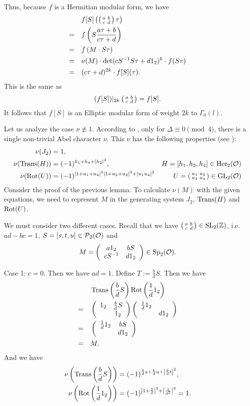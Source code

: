 \begin{lemma}[Restriction]
Thus, because $f$ is a Hermitian modular form, we have
\begin{align*}
& f[S] \left(\left( \begin{smallmatrix} a & b \\ c & d \end{smallmatrix} \right) \tau\right) \\
=\quad & f\left(S \frac{a \tau + b}{c \tau + d} \right) \\
=\quad & f\left( M \cdot S \tau \right) \\
=\quad & \nu(M) \cdot \det(c S^{-1} S \tau + d 1_2)^k \cdot f(S \tau) \\
=\quad & (c \tau + d)^{2k} \cdot f[S](\tau) .
\end{align*}
This is the same as
\[ (f[S]) |_{2k} \left( \begin{smallmatrix} a & b \\ c & d \end{smallmatrix} \right) = f[S] . \]
It follows that $f[S]$ is an Elliptic modular form of weight $2k$ to $\Gamma_0(l)$.
\endproof
\end{lemma}


\begin{remark}\label{remark-nu}
Let us analyze the case $\nu \not\equiv 1$. According to \cite{Dern01Herm}, only for $\Delta \equiv 0 \pmod{4}$, there is a single non-trivial Abel character $\nu$. This $\nu$ has the following properties (see \cite{Dern01Herm}):
\begin{align*}
\nu(J_2) & = 1 , \\
\nu(\operatorname{Trans}(H)) & = (-1)^{h_1 + h_4 + |h_2|^2}, & H = [h_1, h_2, h_4] \in \operatorname{Her}_2(\mathcal{O}) \\
\nu(\operatorname{Rot}(U)) & = (-1)^{|1+u_1+u_4|^2 |1+u_2+u_3|^2 + |u_1 u_4|^2} & U = \left( \begin{smallmatrix} u_1 & u_2 \\ u_3 & u_4 \end{smallmatrix} \right) \in \operatorname{GL}_2(\mathcal{O})
\end{align*}
Consider the proof of the previous lemma. To calculate $\nu(M)$ with the given equations, we need to represent $M$ in the generating system $J_2$, $\operatorname{Trans}(H)$ and $\operatorname{Rot}(U)$.

We must consider two different cases. Recall that we have $\left( \begin{smallmatrix} a & b \\ c & d \end{smallmatrix} \right) \in \operatorname{SL}_2(\mathbb{Z})$, i.e. $ad - bc = 1$, $S = [s,t,u] \in \operatorname{\mathcal{P}}_2(\mathcal{O})$ and
\[ M = \left( \begin{array}{cc} a 1_2 & b S \\ c S^{-1} & d 1_2 \end{array} \right) \in \operatorname{Sp}_2(\mathcal{O}) . \]

Case 1: $c=0$. Then we have $ad=1$. Define $T := \frac{b}{d} S$. Then we have
\begin{align*}
& \operatorname{Trans}\left(\frac{b}{d} S\right) \operatorname{Rot}\left(\frac{1}{d} 1_2\right) \\
=\quad &
\left( \begin{array}{cc} 1_2 & \frac{b}{d} S \\  & 1_2 \end{array} \right)
\left( \begin{array}{cc} \frac{1}{d} 1_2 &  \\  & d 1_2 \end{array} \right) \\
=\quad &
\left( \begin{array}{cc} \frac{1}{d}1_2 & b S \\  & d 1_2 \end{array} \right) \\
=\quad& M .
\end{align*}
And we have
\begin{align*}
\nu\left(\operatorname{Trans}\left(\frac{b}{d} S\right)\right) & = (-1)^{\frac{b}{d}s + \frac{b}{d}u + \left|\frac{b}{d} t \right|^2}, \\
\nu\left(\operatorname{Rot}\left(\frac{1}{d} 1_2\right)\right) & = (-1)^{\left|1 + \frac{2}{d}\right|^2 + \left|\frac{1}{d^2}\right|^2} = 1 .
\end{align*}


\end{remark}
